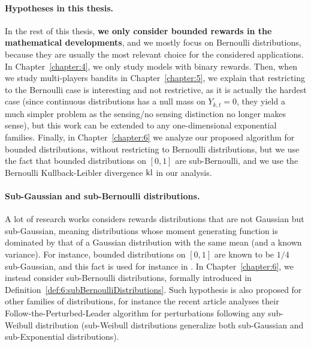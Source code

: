 \paragraph{Hypotheses in this thesis.}
%
In the rest of this thesis, \textbf{we only consider bounded rewards in the mathematical developments}, and we mostly focus on Bernoulli distributions, because they are usually the most relevant choice for the considered applications.
In Chapter~\ref{chapter:4}, we only study models with binary rewards.
%
Then, when we study multi-players bandits in Chapter~\ref{chapter:5}, we explain that restricting to the Bernoulli case is interesting and not restrictive, as it is actually the hardest case (since continuous distributions has a null mass on $Y_{k,t}=0$, they yield a much simpler problem as the sensing/no sensing distinction no longer makes sense), but this work can be extended to any one-dimensional exponential families.
%
Finally, in Chapter~\ref{chapter:6} we analyze our proposed algorithm for bounded distributions, without restricting to Bernoulli distributions, but we use the fact that bounded distributions on $[0,1]$ are sub-Bernoulli, and we use the Bernoulli Kullback-Leibler divergence $\mathrm{kl}$ in our analysis.


\paragraph{Sub-Gaussian and sub-Bernoulli distributions.}
%
A lot of research works considers rewards distributions that are not Gaussian but sub-Gaussian,
meaning distributions whose moment generating function is dominated by that of a Gaussian distribution with the same mean (and a known variance).
For instance, bounded distributions on $[0,1]$ are known to be $1/4$ sub-Gaussian, and this fact is used for instance in \cite{Maillard2018GLR}.
In Chapter~\ref{chapter:6}, we instead consider sub-Bernoulli distributions, formally introduced in Definition~\ref{def:6:subBernoulliDistributions}.
%
Such hypothesis is also proposed for other families of distributions, for instance the recent article \cite{KimTewari2019} analyses their Follow-the-Perturbed-Leader algorithm for perturbations following any sub-Weibull distribution (sub-Weibull distributions generalize both sub-Gaussian and sub-Exponential distributions).



